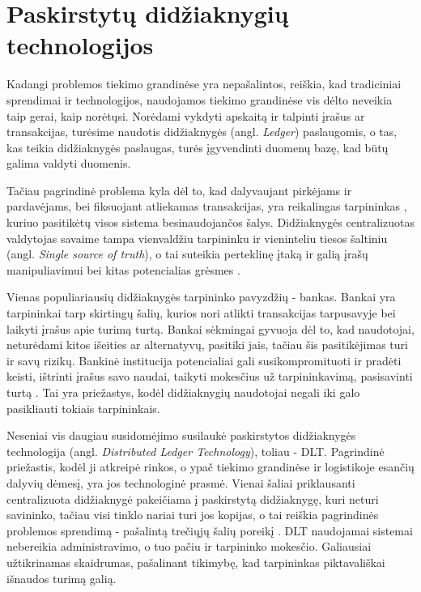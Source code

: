 
\section {Paskirstytų didžiaknygių technologijos}

Kadangi problemos tiekimo grandinėse yra nepašalintos, reiškia, kad tradiciniai sprendimai ir technologijos, naudojamos tiekimo grandinėse vis dėlto neveikia taip gerai, kaip norėtųsi. Norėdami vykdyti apskaitą ir talpinti įrašus ar transakcijas, turėsime naudotis didžiaknygės (angl. \textit{Ledger}) paslaugomis, o tas, kas teikia didžiaknygės paslaugas, turės įgyvendinti duomenų bazę, kad būtų galima valdyti duomenis.

Tačiau pagrindinė problema kyla dėl to, kad dalyvaujant pirkėjams ir pardavėjams, bei fiksuojant atliekamas transakcijas, yra reikalingas tarpininkas \cite{gao2018coc}, kuriuo pasitikėtų visos sistema besinaudojančos šalys. Didžiaknygės centralizuotas valdytojas savaime tampa vienvaldžiu tarpininku ir vieninteliu tiesos šaltiniu (angl. \textit{Single source of truth}), o tai suteikia perteklinę įtaką ir galią įrašų manipuliavimui bei kitas potencialias grėsmes \cite{jiang2017much} \cite{shyamasundar2018blockchain}. 

Vienas populiariausių didžiaknygės tarpininko pavyzdžių - bankas. Bankai yra tarpininkai tarp skirtingų šalių, kurios nori atlikti transakcijas tarpusavyje bei laikyti įrašus apie turimą turtą. Bankai sėkmingai gyvuoja dėl to, kad naudotojai, neturėdami kitos išeities ar alternatyvų, pasitiki jais, tačiau šis pasitikėjimas turi ir savų rizikų. Bankinė institucija potencialiai gali susikompromituoti ir pradėti keisti, ištrinti įrašus savo naudai, taikyti mokesčius už tarpininkavimą, pasisavinti turtą \cite{shyamasundar2018blockchain}. Tai yra priežastys, kodėl didžiaknygių naudotojai negali iki galo pasikliauti tokiais tarpininkais.

Neseniai vis daugiau susidomėjimo susilaukė paskirstytos didžiaknygės technologija (angl. \textit{Distributed Ledger Technology}), toliau - DLT. Pagrindinė priežastis, kodėl ji atkreipė rinkos, o ypač tiekimo grandinėse ir logistikoje esančių dalyvių dėmesį, yra jos technologinė prasmė. Vienai šaliai priklausanti centralizuota didžiaknygė pakeičiama į paskirstytą didžiaknygę, kuri neturi savininko, tačiau visi tinklo nariai turi jos kopijas, o tai reiškia pagrindinės problemos sprendimą - pašalintą trečiųjų šalių poreikį \cite{shyamasundar2018blockchain}. DLT naudojamai sistemai nebereikia administravimo, o tuo pačiu ir tarpininko mokesčio. Galiausiai užtikrinamas skaidrumas, pašalinant tikimybę, kad tarpininkas piktavališkai išnaudos turimą galią.



